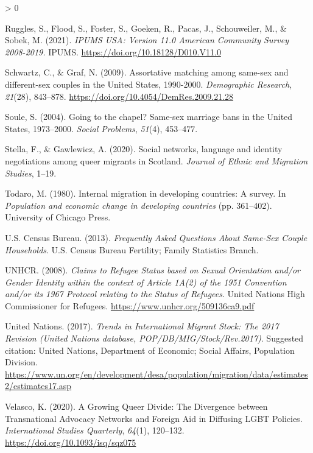 \documentclass[
  11pt,
]{article}
\newlength{\cslhangindent}
\newenvironment{CSLReferences}[2] %
 {%
  \setlength{\parindent}{0pt}
  \ifodd #1 \everypar{\setlength{\hangindent}{\cslhangindent}}\ignorespaces\fi
  \ifnum #2 > 0
  \setlength{\parskip}{#2\baselineskip}
  \fi
 }%
 {}
\begin{document}
\begin{CSLReferences}{1}{0}
\leavevmode\hypertarget{ref-ruggles_2021}{}%
Ruggles, S., Flood, S., Foster, S., Goeken, R., Pacas, J., Schouweiler, M., \& Sobek, M. (2021). \emph{{IPUMS} {USA}: {Version} 11.0 {American} {Community} {Survey} 2008-2019.} IPUMS. \url{https://doi.org/10.18128/D010.V11.0}

\leavevmode\hypertarget{ref-schwartz_2009}{}%
Schwartz, C., \& Graf, N. (2009). Assortative matching among same-sex and different-sex couples in the {United} {States}, 1990-2000. \emph{Demographic Research}, \emph{21}(28), 843--878. \url{https://doi.org/10.4054/DemRes.2009.21.28}

\leavevmode\hypertarget{ref-soule_2004}{}%
Soule, S. (2004). Going to the chapel? {Same}-sex marriage bans in the {United} {States}, 1973--2000. \emph{Social Problems}, \emph{51}(4), 453--477.

\leavevmode\hypertarget{ref-stella_2020}{}%
Stella, F., \& Gawlewicz, A. (2020). Social networks, language and identity negotiations among queer migrants in {Scotland}. \emph{Journal of Ethnic and Migration Studies}, 1--19.

\leavevmode\hypertarget{ref-todaro_1980}{}%
Todaro, M. (1980). Internal migration in developing countries: A survey. In \emph{Population and economic change in developing countries} (pp. 361--402). University of Chicago Press.

\leavevmode\hypertarget{ref-u.s.censusbureau_2013}{}%
U.S. Census Bureau. (2013). \emph{Frequently {Asked} {Questions} {About} {Same}-{Sex} {Couple} {Households}}. U.S. Census Bureau Fertility; Family Statistics Branch.

\leavevmode\hypertarget{ref-unhcr_2008}{}%
UNHCR. (2008). \emph{Claims to {Refugee} {Status} based on {Sexual} {Orientation} and/or {Gender} {Identity} within the context of {Article} {1A}(2) of the 1951 {Convention} and/or its 1967 {Protocol} relating to the {Status} of {Refugees}}. United Nations High Commissioner for Refugees. \url{https://www.unhcr.org/509136ca9.pdf}

\leavevmode\hypertarget{ref-unitednations_2017}{}%
United Nations. (2017). \emph{Trends in {International} {Migrant} {Stock}: {The} 2017 {Revision} ({United} {Nations} database, {POP}/{DB}/{MIG}/{Stock}/{Rev}.2017)}. Suggested citation: United Nations, Department of Economic; Social Affairs, Population Division. \url{https://www.un.org/en/development/desa/population/migration/data/estimates2/estimates17.asp}

\leavevmode\hypertarget{ref-velasco_2020}{}%
Velasco, K. (2020). A {Growing} {Queer} {Divide}: {The} {Divergence} between {Transnational} {Advocacy} {Networks} and {Foreign} {Aid} in {Diffusing} {LGBT} {Policies}. \emph{International Studies Quarterly}, \emph{64}(1), 120--132. \url{https://doi.org/10.1093/isq/sqz075}


\end{CSLReferences}
\end{document}
